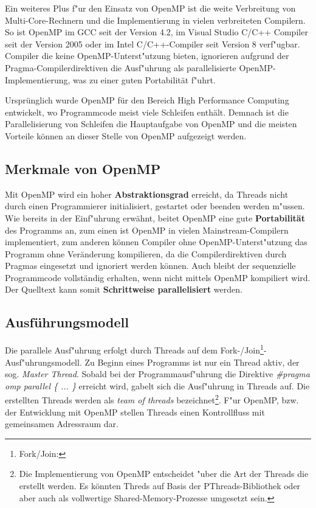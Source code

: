 \documentclass[11pt]{scrartcl}
\begin{document}
Ein weiteres Plus f"ur den Einsatz von OpenMP ist die weite Verbreitung von Multi-Core-Rechnern und die Implementierung in vielen verbreiteten Compilern. So ist OpenMP im GCC seit der Version 4.2, im Visual Studio C/C++ Compiler seit der Version 2005 oder im Intel C/C++-Compiler seit Version 8 verf"ugbar. Compiler die keine OpenMP-Unterst"utzung bieten, ignorieren aufgrund der Pragma-Compilerdirektiven die Ausf"uhrung als parallelisierte OpenMP-Implementierung, was zu einer guten Portabilität f"uhrt.

Ursprünglich wurde OpenMP für den Bereich High Performance Computing entwickelt, wo Programmcode meist viele Schleifen enthält. Demnach ist die Parallelisierung von Schleifen die Hauptaufgabe von OpenMP und die meisten Vorteile können an dieser Stelle von OpenMP aufgezeigt werden. 

\subsection{Merkmale von OpenMP}

Mit OpenMP wird ein hoher \textbf{Abstraktionsgrad} erreicht, da Threads nicht durch einen Programmierer initialisiert, gestartet oder beenden werden m"ussen. Wie bereits in der Einf"uhrung erwähnt, beitet OpenMP eine gute \textbf{Portabilität} des Programms an, zum einen ist OpenMP in vielen Mainstream-Compilern implementiert, zum anderen können Compiler ohne OpenMP-Unterst"utzung das Programm ohne Veränderung kompilieren, da die Compilerdirektiven durch Pragmas eingesetzt und ignoriert werden können. Auch bleibt der sequenzielle Programmcode vollständig erhalten, wenn nicht mittels OpenMP kompiliert wird. Der Quelltext kann somit \textbf{Schrittweise parallelisiert} werden. 

\subsection{Ausführungsmodell}

Die parallele Ausf"uhrung erfolgt durch Threads auf dem
Fork-/Join\footnote{Fork/Join:}-Ausf"uhrungsmodell. Zu Beginn eines Programms ist nur ein Thread aktiv, der sog. \textit{Master Thread}. Sobald bei der Programmausf"uhrung die Direktive \textit{\#pragma omp parallel \{ ... \} } erreicht wird, gabelt sich die
Ausf"uhrung in Threads auf. Die erstellten Threads werden als \textit{team of threads}
bezeichnet\footnote{Die Implementierung von OpenMP entscheidet "uber die Art der Threads die erstellt werden. Es könnten Threds auf Basis der PThreads-Bibliothek oder aber auch als vollwertige Shared-Memory-Prozesse umgesetzt sein.}. F"ur OpenMP, bzw. der Entwicklung mit OpenMP stellen Threads einen Kontrollfluss mit gemeinsamen Adressraum dar.
\end{document}

